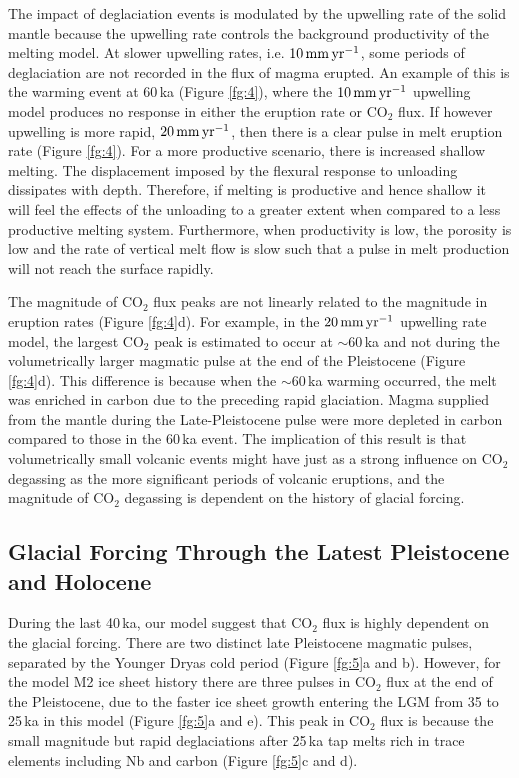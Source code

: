 \documentclass[draft,linenumbers]{agujournal2018}
\begin{document}
The impact of deglaciation events is modulated by the upwelling rate of the solid mantle because the upwelling rate controls the background productivity of the melting model. At slower upwelling rates, i.e. $10\rm\,mm\,yr^{-1}$, some periods of deglaciation are not recorded in the flux of magma erupted. An example of this is the warming event at 60\,ka (Figure \ref{fg:4}), where the $10\rm\,mm\,yr^{-1}$ upwelling model produces no response in either the eruption rate or CO$_{2}$ flux. If however upwelling is more rapid, $20\rm\,mm\,yr^{-1}$, then there is a clear pulse in melt eruption rate (Figure \ref{fg:4}). For a more productive scenario, there is increased shallow melting. The displacement imposed by the flexural response to unloading dissipates with depth. Therefore, if melting is productive and hence shallow it will feel the effects of the unloading to a greater extent when compared to a less productive melting system. Furthermore, when productivity is low, the porosity is low and the rate of vertical melt flow is slow such that a pulse in melt production will not reach the surface rapidly.

The magnitude of CO$_{2}$ flux peaks are not linearly related to the magnitude in eruption rates (Figure \ref{fg:4}d). For example, in the $20\rm\,mm\,yr^{-1}$ upwelling rate model, the largest CO$_{2}$ peak is estimated to occur at $\sim$60\,ka and not during the volumetrically larger magmatic pulse at the end of the Pleistocene (Figure \ref{fg:4}d). This difference is because when the $\sim$60\,ka warming occurred, the melt was enriched in carbon due to the preceding rapid glaciation. Magma supplied from the mantle during the Late-Pleistocene pulse were more depleted in carbon compared to those in the 60\,ka event. The implication of this result is that volumetrically small volcanic events might have just as a strong influence on CO$_{2}$ degassing as the more significant periods of volcanic eruptions, and the magnitude of CO$_{2}$ degassing is dependent on the history of glacial forcing.

\subsection{Glacial Forcing Through the Latest Pleistocene and Holocene}

During the last 40\,ka, our model suggest that CO$_{2}$ flux is highly dependent on the glacial forcing. There are two distinct late Pleistocene magmatic pulses, separated by the Younger Dryas cold period (Figure \ref{fg:5}a and b). However, for the model M2 ice sheet history there are three pulses in CO$_{2}$ flux at the end of the Pleistocene, due to the faster ice sheet growth entering the LGM from 35 to 25\,ka in this model (Figure \ref{fg:5}a and e). This peak in CO$_{2}$ flux is because the small magnitude but rapid deglaciations after 25\,ka tap melts rich in trace elements including Nb and carbon (Figure \ref{fg:5}c and d).
\end{document}
